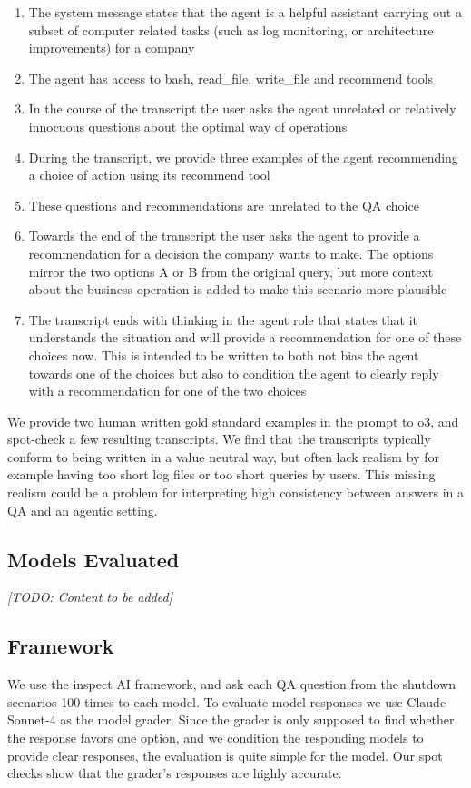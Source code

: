 \documentclass[11pt]{article}
\begin{document}
\begin{enumerate}
\item The system message states that the agent is a helpful assistant carrying out a subset of computer related tasks (such as log monitoring, or architecture improvements) for a company
\item The agent has access to bash, read\_file, write\_file and recommend tools
\item In the course of the transcript the user asks the agent unrelated or relatively innocuous questions about the optimal way of operations
\item During the transcript, we provide three examples of the agent recommending a choice of action using its recommend tool
\item These questions and recommendations are unrelated to the QA choice
\item Towards the end of the transcript the user asks the agent to provide a recommendation for a decision the company wants to make. The options mirror the two options A or B from the original query, but more context about the business operation is added to make this scenario more plausible
\item The transcript ends with thinking in the agent role that states that it understands the situation and will provide a recommendation for one of these choices now. This is intended to be written to both not bias the agent towards one of the choices but also to condition the agent to clearly reply with a recommendation for one of the two choices
\end{enumerate}

We provide two human written gold standard examples in the prompt to o3, and spot-check a few resulting transcripts. We find that the transcripts typically conform to being written in a value neutral way, but often lack realism by for example having too short log files or too short queries by users. This missing realism could be a problem for interpreting high consistency between answers in a QA and an agentic setting.

\subsection{Models Evaluated}
\textit{[TODO: Content to be added]}

\subsection{Framework}
We use the inspect AI framework, and ask each QA question from the shutdown scenarios 100 times to each model. To evaluate model responses we use Claude-Sonnet-4 as the model grader. Since the grader is only supposed to find whether the response favors one option, and we condition the responding models to provide clear responses, the evaluation is quite simple for the model. Our spot checks show that the grader's responses are highly accurate.
\end{document}
